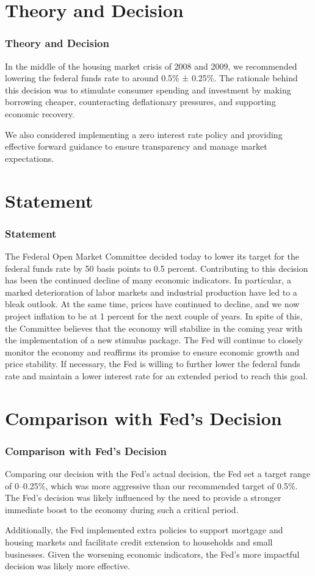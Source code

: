 \documentclass{beamer}
\begin{document}
\section{Theory and Decision}
\begin{frame}
    \frametitle{Theory and Decision}
    In the middle of the housing market crisis of 2008 and 2009, we recommended lowering the federal funds rate to around 0.5\% ± 0.25\%. The rationale behind this decision was to stimulate consumer spending and investment by making borrowing cheaper, counteracting deflationary pressures, and supporting economic recovery.
    \newline
    
    We also considered implementing a zero interest rate policy and providing effective forward guidance to ensure transparency and manage market expectations.
\end{frame}

\section{Statement}
\begin{frame}
    \frametitle{Statement}
    The Federal Open Market Committee decided today to lower its target for the federal funds rate by 50 basis points to 0.5 percent. Contributing to this decision has been the continued decline of many economic indicators. In particular, a marked deterioration of labor markets and industrial production have led to a bleak outlook. At the same time, prices have continued to decline, and we now project inflation to be at 1 percent for the next couple of years. In spite of this, the Committee believes that the economy will stabilize in the coming year with the implementation of a new stimulus package. The Fed will continue to closely monitor the economy and reaffirms its promise to ensure economic growth and price stability. If necessary, the Fed is willing to further lower the federal funds rate and maintain a lower interest rate for an extended period to reach this goal.
\end{frame}

\section{Comparison with Fed's Decision}
\begin{frame}
    \frametitle{Comparison with Fed's Decision}
    Comparing our decision with the Fed's actual decision, the Fed set a target range of 0--0.25\%, which was more aggressive than our recommended target of 0.5\%. The Fed's decision was likely influenced by the need to provide a stronger immediate boost to the economy during such a critical period.
    \newline
    
    Additionally, the Fed implemented extra policies to support mortgage and housing markets and facilitate credit extension to households and small businesses. Given the worsening economic indicators, the Fed's more impactful decision was likely more effective.
\end{frame}
\end{document}
